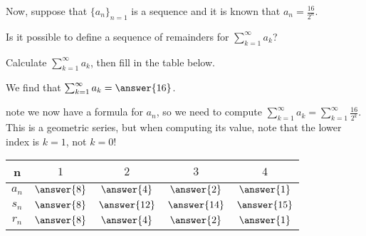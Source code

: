 \documentclass{ximera}
\begin{document}
\begin{exercise}
Now, suppose that $\{a_n\}_{n=1}$ is a sequence and it is known that $a_n = \frac{16}{2^n}$.

Is it possible to define a sequence of remainders for $\sum_{k=1}^{\infty} a_k$?

\begin{multipleChoice}
\end{multipleChoice}

\begin{exercise}
Calculate $\sum_{k=1}^{\infty} a_k$, then fill in the table below.

We find that $\sum_{k=1}^{\infty} a_k = \answer{16}$.

\begin{hint}
note we now have a formula for $a_n$, so we need to compute $\sum_{k=1}^{\infty} a_k=\sum_{k=1}^{\infty} \frac{16}{2^k}$.  This is a geometric series, but when computing its value, note that the lower index is $k=1$, not $k=0$!
\end{hint}

\begin{center}
\begin{tabular}{c | c | c | c | c }
n& $1$ & $2$ & $3$ & $4$ \\ [2 ex]
\hline
$a_n$ & $ \answer{8}$ &$ \answer{4}$ & $ \answer{2}$ & $ \answer{1}$  \\ [2 ex]
\hline
$s_n$ & $ \answer{8}$ &$ \answer{12}$ & $ \answer{14}$ & $ \answer{15}$  \\ [2 ex]
\hline
$r_n$ & $ \answer{8}$ & $ \answer{4}$ & $ \answer{2}$ & $ \answer{1}$ 
\end{tabular}
\end{center}

\end{exercise}
\end{exercise}
\end{document}

